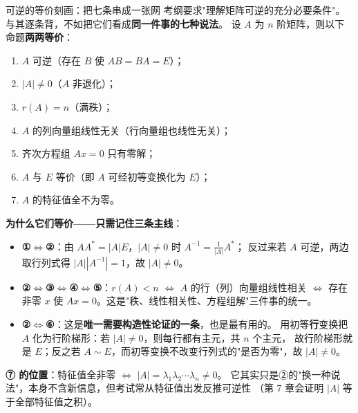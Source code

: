 
\begin{fdeep}{可逆的等价刻画：把七条串成一张网}
考纲要求"理解矩阵可逆的充分必要条件"。与其逐条背，不如把它们看成\textbf{同一件事的七种说法}。
设 $A$ 为 $n$ 阶矩阵，则以下命题\textbf{两两等价}：
\begin{enumerate}[leftmargin=2.2em,itemsep=0.22em]
\item $A$ 可逆（存在 $B$ 使 $AB=BA=E$）；
\item $|A|\ne0$（$A$ 非退化）；
\item $r(A)=n$（满秩）；
\item $A$ 的列向量组线性无关（行向量组也线性无关）；
\item 齐次方程组 $Ax=0$ 只有零解；
\item $A$ 与 $E$ 等价（即 $A$ 可经初等变换化为 $E$）；
\item $A$ 的特征值全不为零。
\end{enumerate}

\textbf{为什么它们等价——只需记住三条主线}：
\begin{itemize}[leftmargin=2.2em,itemsep=0.25em]
\item \textbf{①$\Leftrightarrow$②}：由 $AA^{*}=|A|E$，$|A|\ne0$ 时 $A^{-1}=\frac1{|A|}A^{*}$；
      反过来若 $A$ 可逆，两边取行列式得 $|A||A^{-1}|=1$，故 $|A|\ne0$。
\item \textbf{②$\Leftrightarrow$③$\Leftrightarrow$④$\Leftrightarrow$⑤}：$r(A)<n$ $\iff$ $A$ 的行（列）向量组线性相关
      $\iff$ 存在非零 $x$ 使 $Ax=0$。这是"秩、线性相关性、方程组解"三件事的统一。
\item \textbf{②$\Leftrightarrow$⑥}：这是\textbf{唯一需要构造性论证的一条}，也是最有用的。
      用初等\textbf{行}变换把 $A$ 化为行阶梯形：若 $|A|\ne0$，则每行都有主元，共 $n$ 个主元，
      故行阶梯形就是 $E$；反之若 $A\sim E$，而初等变换不改变行列式的"是否为零"，故 $|A|\ne0$。
\end{itemize}
\textbf{⑦ 的位置}：特征值全非零 $\iff$ $|A|=\lambda_1\lambda_2\cdots\lambda_n\ne0$。
它其实只是②的"换一种说法"，本身不含新信息，但考试常从特征值出发反推可逆性
（第 7 章会证明 $|A|$ 等于全部特征值之积）。


\end{fdeep}
